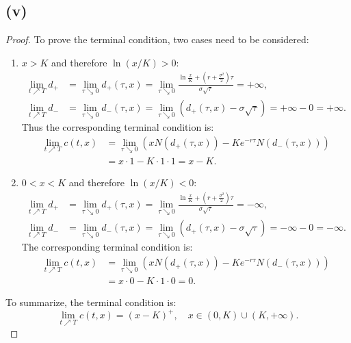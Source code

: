 \documentclass[final,3p,authoryear]{elsarticle}
\begin{document}
	\subsection{(v)}
		\begin{proof}
			To prove the terminal condition, two cases need to be considered:
			\begin{enumerate}
				\item $x>K$ and therefore $\ln(x/K)>0$:
					\begin{align}
						\lim\limits_{t \nearrow T} d_+ &= \lim\limits_{\tau \searrow 0} d_+(\tau,x) = \lim\limits_{\tau \searrow 0} \frac{\ln\frac{x}{K}+\left(r+\frac{\sigma^2}{2}\right)\tau}{\sigma\sqrt{\tau}} = +\infty
						,
						\\
						\lim\limits_{t \nearrow T} d_- &= \lim\limits_{\tau \searrow 0} d_-(\tau,x) = \lim\limits_{\tau \searrow 0} \left(d_+(\tau,x) - \sigma\sqrt{\tau}\right) = +\infty - 0 = +\infty
						.
					\end{align}
					Thus the corresponding terminal condition is:
					\begin{align}
						\lim\limits_{t \nearrow T} c(t,x) &= \lim\limits_{\tau \searrow 0} \left( x N(d_+(\tau,x)) - K e^{-r\tau} N(d_-(\tau,x)) \right)
						\nonumber\\
						&= x\cdot 1 - K\cdot 1 \cdot 1 = x - K
						.
					\end{align}
				\item $0<x<K$ and therefore $\ln(x/K)<0$:
					\begin{align}
						\lim\limits_{t \nearrow T} d_+ &= \lim\limits_{\tau \searrow 0} d_+(\tau,x) = \lim\limits_{\tau \searrow 0} \frac{\ln\frac{x}{K}+\left(r+\frac{\sigma^2}{2}\right)\tau}{\sigma\sqrt{\tau}} = -\infty
						,
						\\
						\lim\limits_{t \nearrow T} d_- &= \lim\limits_{\tau \searrow 0} d_-(\tau,x) = \lim\limits_{\tau \searrow 0} \left(d_+(\tau,x) - \sigma\sqrt{\tau}\right) = -\infty - 0 = -\infty
						.
					\end{align}
					The corresponding terminal condition is:
					\begin{align}
						\lim\limits_{t \nearrow T} c(t,x) &= \lim\limits_{\tau \searrow 0} \left( x N(d_+(\tau,x)) - K e^{-r\tau} N(d_-(\tau,x)) \right)
						\nonumber\\
						&= x\cdot 0 - K\cdot 1 \cdot 0 = 0
						.
					\end{align}
			\end{enumerate}
			To summarize, the terminal condition is:
			\begin{equation}
				\lim\limits_{t \nearrow T} c(t,x) = \left( x-K \right)^+, \quad x \in \left(0,K\right) \cup \left(K,+\infty\right)
				.
			\end{equation}
		\end{proof}
	
\end{document}
